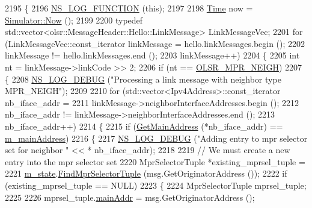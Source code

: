 \begin{DoxyCode}
2195 \{
2196   \hyperlink{log-macros-disabled_8h_a90b90d5bad1f39cb1b64923ea94c0761}{NS\_LOG\_FUNCTION} (\textcolor{keyword}{this});
2197 
2198   \hyperlink{namespacens3_1_1TracedValueCallback_a7ffd3e7c142ffe7c8a1d2db9b8de38ec}{Time} now = \hyperlink{classns3_1_1Simulator_ac3178fa975b419f7875e7105be122800}{Simulator::Now} ();
2199 
2200   \textcolor{keyword}{typedef} std::vector<olsr::MessageHeader::Hello::LinkMessage> LinkMessageVec;
2201   \textcolor{keywordflow}{for} (LinkMessageVec::const\_iterator linkMessage = hello.linkMessages.begin ();
2202        linkMessage != hello.linkMessages.end ();
2203        linkMessage++)
2204     \{
2205       \textcolor{keywordtype}{int} nt = linkMessage->linkCode >> 2;
2206       \textcolor{keywordflow}{if} (nt == \hyperlink{olsr-routing-protocol_8cc_a08fbe0b4c74b944f681630df4fa0fd82}{OLSR\_MPR\_NEIGH})
2207         \{
2208           \hyperlink{group__logging_ga413f1886406d49f59a6a0a89b77b4d0a}{NS\_LOG\_DEBUG} (\textcolor{stringliteral}{"Processing a link message with neighbor type MPR\_NEIGH"});
2209 
2210           \textcolor{keywordflow}{for} (std::vector<Ipv4Address>::const\_iterator nb\_iface\_addr =
2211                  linkMessage->neighborInterfaceAddresses.begin ();
2212                nb\_iface\_addr != linkMessage->neighborInterfaceAddresses.end ();
2213                nb\_iface\_addr++)
2214             \{
2215               \textcolor{keywordflow}{if} (\hyperlink{classns3_1_1olsr_1_1RoutingProtocol_ae01451170fb389d322b33ed6d954f460}{GetMainAddress} (*nb\_iface\_addr) == \hyperlink{classns3_1_1olsr_1_1RoutingProtocol_a58cc50ed5d1039aab603e90e318aabfb}{m\_mainAddress})
2216                 \{
2217                   \hyperlink{group__logging_ga413f1886406d49f59a6a0a89b77b4d0a}{NS\_LOG\_DEBUG} (\textcolor{stringliteral}{"Adding entry to mpr selector set for neighbor "} << *
      nb\_iface\_addr);
2218 
2219                   \textcolor{comment}{// We must create a new entry into the mpr selector set}
2220                   MprSelectorTuple *existing\_mprsel\_tuple =
2221                     \hyperlink{classns3_1_1olsr_1_1RoutingProtocol_a07942ec1a7df71b609c8d2ff3b567c49}{m\_state}.\hyperlink{classns3_1_1olsr_1_1OlsrState_a81bb1e9642f6b840094d199d3654b984}{FindMprSelectorTuple} (msg.GetOriginatorAddress ());
2222                   \textcolor{keywordflow}{if} (existing\_mprsel\_tuple == NULL)
2223                     \{
2224                       MprSelectorTuple mprsel\_tuple;
2225 
2226                       mprsel\_tuple.\hyperlink{structns3_1_1olsr_1_1MprSelectorTuple_a7e1e37f791d34c0e3e0e2b57ab5d1925}{mainAddr} = msg.GetOriginatorAddress ();

\end{DoxyCode}
